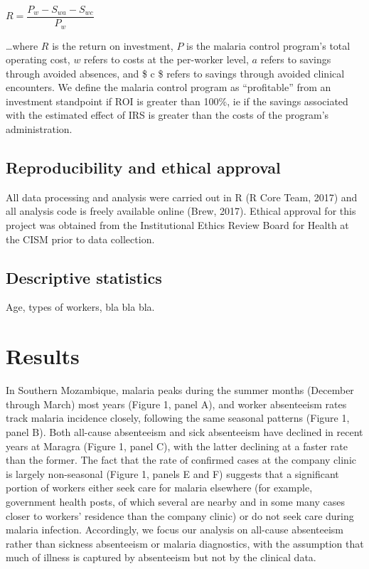\documentclass[]{article}
\begin{document}
\begin{center}
$R = \dfrac{P_{w} - S_{wa} - S_{wc}}{P_{w}}$

\end{center}

\ldots{}where \(R\) is the return on investment, \(P\) is the malaria
control program's total operating cost, \(w\) refers to costs at the
per-worker level, \(a\) refers to savings through avoided absences, and
\$ c \$ refers to savings through avoided clinical encounters. We define
the malaria control program as ``profitable'' from an investment
standpoint if ROI is greater than 100\%, ie if the savings associated
with the estimated effect of IRS is greater than the costs of the
program's administration.

\subsection{Reproducibility and ethical
approval}\label{reproducibility-and-ethical-approval}

All data processing and analysis were carried out in R (R Core Team,
2017) and all analysis code is freely available online (Brew, 2017).
Ethical approval for this project was obtained from the Institutional
Ethics Review Board for Health at the CISM prior to data collection.

\subsection{Descriptive statistics}\label{descriptive-statistics}

Age, types of workers, bla bla bla.

\section{Results}\label{results}

In Southern Mozambique, malaria peaks during the summer months (December
through March) most years (Figure 1, panel A), and worker absenteeism
rates track malaria incidence closely, following the same seasonal
patterns (Figure 1, panel B). Both all-cause absenteeism and sick
absenteeism have declined in recent years at Maragra (Figure 1, panel
C), with the latter declining at a faster rate than the former. The fact
that the rate of confirmed cases at the company clinic is largely
non-seasonal (Figure 1, panels E and F) suggests that a significant
portion of workers either seek care for malaria elsewhere (for example,
government health posts, of which several are nearby and in some many
cases closer to workers' residence than the company clinic) or do not
seek care during malaria infection. Accordingly, we focus our analysis
on all-cause absenteeism rather than sickness absenteeism or malaria
diagnostics, with the assumption that much of illness is captured by
absenteeism but not by the clinical data.
\end{document}
